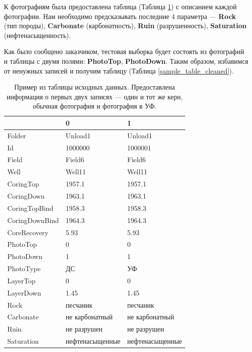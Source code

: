 \documentclass[14pt]{matmex-diploma}
\begin{document}
    К фотографиям была предоставлена таблица (Таблица \ref{sample_table}) с описанием каждой фотографии. Нам необходимо предсказывать последние 4 параметра — \textbf{Rock} (тип породы), \textbf{Carbonate} (карбонатность), \textbf{Ruin} (разрушенность), \textbf{Saturation} (нефтенасыщенность). 
        
    Как было сообщено заказчиком, тестовая выборка будет состоять из фотографий и таблицы с двумя полями: \textbf{PhotoTop}, \textbf{PhotoDown}. Таким образом, избавимся от ненужных записей и получим таблицу (Таблица \ref{sample_table_cleaned}).
    
    \begin{table}[h!]
        \centering
        \begin{tabular}{|l|l|l|}
            \hline
            {} &                0 &                1 \\
            \hline
            Folder         &          Unload1 &          Unload1 \\
            Id             &          1000000 &          1000001 \\
            Field          &           Field6 &           Field6 \\
            Well           &           Well11 &           Well11 \\
            CoringTop      &           1957.1 &           1957.1 \\
            CoringDown     &           1963.1 &           1963.1 \\
            CoringTopBind  &           1958.3 &           1958.3 \\
            CoringDownBind &           1964.3 &           1964.3 \\
            CoreRecovery   &             5.93 &             5.93 \\
            PhotoTop       &                0 &                0 \\
            PhotoDown      &                1 &                1 \\
            PhotoType      &               ДС &               УФ \\
            LayerTop       &                0 &                0 \\
            LayerDown      &             1.45 &             1.45 \\
            Rock           &         песчаник &         песчаник \\
            Carbonate      &   не карбонатный &   не карбонатный \\
            Ruin           &      не разрушен &      не разрушен \\
            Saturation     &  нефтенасыщенные &  нефтенасыщенные \\
            \hline
        \end{tabular}
        \caption{Пример из таблицы исходных данных. Предоставлена информация о первых двух записях — один и тот же керн, обычная фотография и фотография в УФ.}
        \label{sample_table}  
        \vspace*{2 cm}
    \end{table}
\end{document}
